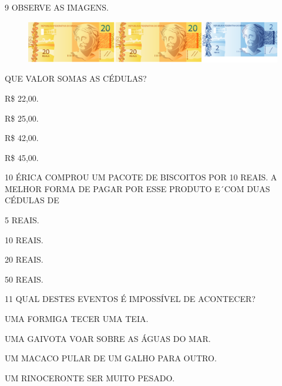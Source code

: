 \num{9} OBSERVE AS IMAGENS.


\begin{figure}[htpb!]
\centering
\includegraphics[width=\textwidth]{./media/SAEB_1ANO_MAT_FIGURA117b.png}
\end{figure}

QUE VALOR SOMAS AS CÉDULAS?

\begin{escolha}[itemsep=0pt]
\item R\$ 22,00.

\item R\$ 25,00.

\item R\$ 42,00.

\item R\$ 45,00.
\end{escolha}

\pagebreak
\num{10} ÉRICA COMPROU UM PACOTE DE BISCOITOS POR 10 REAIS. A MELHOR
FORMA DE PAGAR POR ESSE PRODUTO E´COM DUAS CÉDULAS DE

\begin{escolha}[itemsep=0pt]
\item 5 REAIS.

\item 10 REAIS.

\item 20 REAIS.

\item 50 REAIS.
\end{escolha}

\num{11} QUAL DESTES EVENTOS É IMPOSSÍVEL DE ACONTECER?

\begin{escolha}[itemsep=0pt]
\item UMA FORMIGA TECER UMA TEIA.

\item UMA GAIVOTA VOAR SOBRE AS ÁGUAS DO MAR.

\item UM MACACO PULAR DE UM GALHO PARA OUTRO.

\item UM RINOCERONTE SER MUITO PESADO.
\end{escolha}


